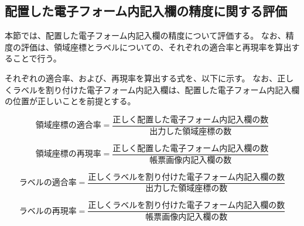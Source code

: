 



\subsection{配置した電子フォーム内記入欄の精度に関する評価}\label{subsec:evalue_accuracy}
本節では、配置した電子フォーム内記入欄の精度について評価する。
なお、精度の評価は、領域座標とラベルについての、それぞれの適合率と再現率を算出することで行う。

それぞれの適合率、および、再現率を算出する式を、以下に示す。
なお、正しくラベルを割り付けた電子フォーム内記入欄は、配置した電子フォーム内記入欄の位置が正しいことを前提とする。

\begin{equation}\label{eq:area_precision}
    領域座標の適合率=\frac{正しく配置した電子フォーム内記入欄の数}{出力した領域座標の数}
\end{equation}

\begin{equation}\label{eq:area_recall}
    領域座標の再現率=\frac{正しく配置した電子フォーム内記入欄の数}{帳票画像内記入欄の数}
\end{equation}

\begin{equation}\label{eq:label_precision}
    ラベルの適合率=\frac{正しくラベルを割り付けた電子フォーム内記入欄の数}{出力した領域座標の数}
\end{equation}

\begin{equation}\label{eq:label_recall}
    ラベルの再現率=\frac{正しくラベルを割り付けた電子フォーム内記入欄の数}{帳票画像内記入欄の数}
\end{equation}

